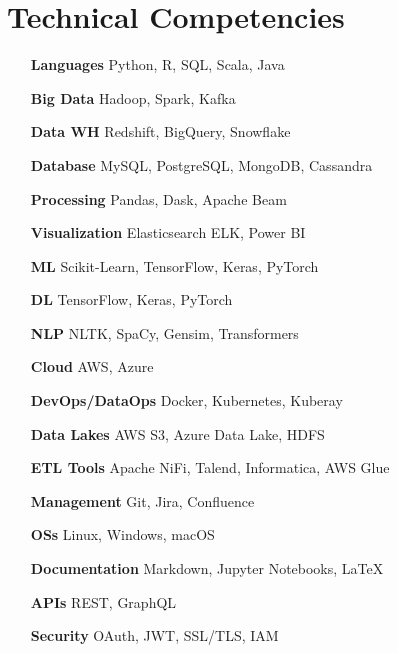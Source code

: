 \section{Technical Competencies}

\begin{multicols}{2}
    \begin{itemize}[itemsep=-2px, parsep=1pt, leftmargin=75pt]
        \item[\textbf{Languages}] Python, R, SQL, Scala, Java
        \item[\textbf{Big Data}] Hadoop, Spark, Kafka
        \item[\textbf{Data WH}] Redshift, BigQuery, Snowflake
        \item[\textbf{Database}] MySQL, PostgreSQL, MongoDB, Cassandra
        \item[\textbf{Processing}] Pandas, Dask, Apache Beam
        \item[\textbf{Visualization}] Elasticsearch ELK, Power BI
        \item[\textbf{ML}] Scikit-Learn, TensorFlow, Keras, PyTorch
        \item[\textbf{DL}] TensorFlow, Keras, PyTorch
        \item[\textbf{NLP}] NLTK, SpaCy, Gensim, Transformers
        \item[\textbf{Cloud}] AWS, Azure
        \item[\textbf{DevOps/DataOps}] Docker, Kubernetes, Kuberay
        \item[\textbf{Data Lakes}] AWS S3, Azure Data Lake, HDFS
        \item[\textbf{ETL Tools}] Apache NiFi, Talend, Informatica, AWS Glue
        \item[\textbf{Management}] Git, Jira, Confluence
        \item[\textbf{OSs}] Linux, Windows, macOS
        \item[\textbf{Documentation}] Markdown, Jupyter Notebooks, LaTeX
        \item[\textbf{APIs}] REST, GraphQL
        \item[\textbf{Security}] OAuth, JWT, SSL/TLS, IAM
    \end{itemize}
\end{multicols}
